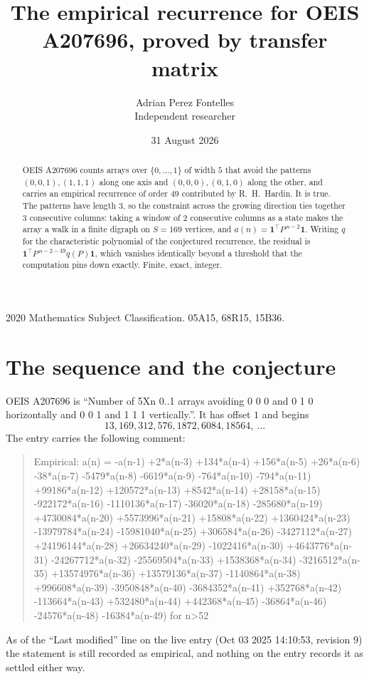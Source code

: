 \documentclass[11pt,a4paper]{article}
\title{The empirical recurrence for OEIS A207696, proved by transfer matrix}
\author{Adrian Perez Fontelles\\ \small Independent researcher}
\date{31 August 2026}
\theoremstyle{plain}
\theoremstyle{definition}
\begin{document}
\maketitle

\begin{abstract}
OEIS A207696 counts arrays over $\{0,\dots,1\}$ of width $5$ that avoid the patterns
$(0,0,1), (1,1,1)$ along one axis and $(0,0,0), (0,1,0)$ along the other, and carries an empirical recurrence of
order $49$ contributed by R.~H.~Hardin. It is true. The patterns have length $3$, so
the constraint across the growing direction ties together $3$ consecutive columns: taking a
window of $2$ consecutive columns as a state makes the array a walk in a finite digraph
on $S=169$ vertices, and $a(n)=\mathbf{1}^{\!\top}P^{\,n-2}\mathbf{1}$. Writing $q$
for the characteristic polynomial of the conjectured recurrence, the residual is
$\mathbf{1}^{\!\top}P^{\,n-2-49}q(P)\mathbf{1}$, which vanishes identically
beyond a threshold that the computation pins down exactly. Finite, exact, integer.
\end{abstract}

\noindent\small 2020 Mathematics Subject Classification. 05A15, 68R15, 15B36.\normalsize

\section{The sequence and the conjecture}

OEIS A207696 is ``Number of 5Xn 0..1 arrays avoiding 0 0 0 and 0 1 0 horizontally and 0 0 1 and 1 1 1 vertically.''. It has offset
$1$ and begins
\[
13, 169, 312, 576, 1872, 6084, 18564,\ \dots
\]
The entry carries the following comment:
\begin{quote}\small
Empirical: a(n) = -a(n-1) +2*a(n-3) +134*a(n-4) +156*a(n-5) +26*a(n-6) -38*a(n-7) -5479*a(n-8) -6619*a(n-9) -764*a(n-10) -794*a(n-11) +99186*a(n-12) +120572*a(n-13) +8542*a(n-14) +28158*a(n-15) -922172*a(n-16) -1110136*a(n-17) -36020*a(n-18) -285680*a(n-19) +4730084*a(n-20) +5573996*a(n-21) +15808*a(n-22) +1360424*a(n-23) -13979784*a(n-24) -15981040*a(n-25) +306584*a(n-26) -3427112*a(n-27) +24196144*a(n-28) +26634240*a(n-29) -1022416*a(n-30) +4643776*a(n-31) -24267712*a(n-32) -25569504*a(n-33) +1538368*a(n-34) -3216512*a(n-35) +13574976*a(n-36) +13579136*a(n-37) -1140864*a(n-38) +996608*a(n-39) -3950848*a(n-40) -3684352*a(n-41) +352768*a(n-42) -113664*a(n-43) +532480*a(n-44) +442368*a(n-45) -36864*a(n-46) -24576*a(n-48) -16384*a(n-49) for n>52
\end{quote}
As of the ``Last modified'' line on the live entry (Oct 03 2025 14:10:53, revision
9) the statement is still recorded as empirical, and nothing on the entry
records it as settled either way.
\end{document}
